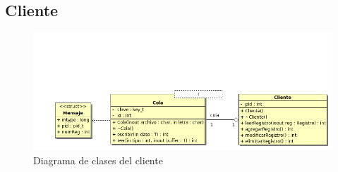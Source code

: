 \documentclass[a4paper,10pt]{article}
\begin{document}
\newpage
\subsection{Cliente}
			
\begin{figure}[!htpb]
    \centering
    \includegraphics[width=12cm]{cliente.png}
    \caption{Diagrama de clases del cliente}
\end{figure}		
		
		

				
\end{document}
